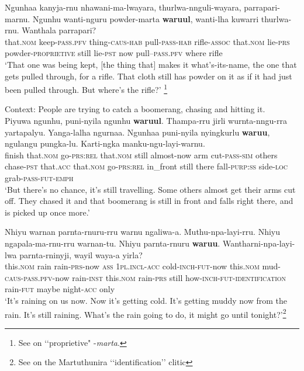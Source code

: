 \begin{exe}
	\ex\label{exappendixMartuthinura1}
	\gll Ngunhaa kanyja-rnu nhawani-ma-lwayara, thurlwa-nnguli-wayara, parrapari-marnu. Ngunhu wanti-nguru powder-marta \textbf{waruul}, wanti-lha kuwarri thurlwa-rnu. Wanthala parrapari?\\
	that.\textsc{nom} keep-\textsc{pass}.\textsc{pfv} thing-\textsc{caus}-\textsc{hab} pull-\textsc{pass}-\textsc{hab} rifle-\textsc{assoc} that.\textsc{nom} lie-\textsc{prs} powder-\textsc{proprietive} still lie-\textsc{pst} now pull--\textsc{pass}.\textsc{pfv}  where rifle\\
	\glt \lq That one was being kept, [the thing that] makes it what's-its-name, the one that gets pulled through, for a rifle. That cloth still has powder on it as if it had just been pulled through. But where's the rifle?'  \parencite[147]{Dench1994}\footnote{See \textcite[84–87]{Dench1994} on \lq\lq proprietive" \mbox{-\textit{marta}}.}

	\ex\label{exappendixMartuthinura2}
	Context: People are trying to catch a boomerang, chasing and hitting it.\\
	\gll Piyuwa ngunhu, puni-nyila ngunhu \textbf{waruul}. Thampa-rru jirli wurnta-nngu-rra yartapalyu. Yanga-lalha ngurnaa. Ngunhaa puni-nyila nyingkurlu \textbf{waruu}, ngulangu pungka-lu. Karti-ngka manku-ngu-layi-warnu. \\
	finish that.\textsc{nom} go-\textsc{prs}:\textsc{rel} that.\textsc{nom} still almost-now arm cut-\textsc{pass}-\textsc{sim} others chase-\textsc{pst} that.\textsc{acc} that.\textsc{nom} go-\textsc{prs}:\textsc{rel} in\_front still there fall-\textsc{purp}:\textsc{ss} side-\textsc{loc} grab-\textsc{pass}-\textsc{fut}-\textsc{emph}\\
	 \glt \lq But there's no chance, it's still travelling. Some others almost get their arms cut off. They chased it and that boomerang is still in front and falls right there, and is picked up once more.\rq{ }\parencite[293–294]{Dench1994}

	\ex \label{exappendixMartuthinura3}
	 \gll Nhiyu warnan parnta-rnuru-rru warnu ngaliwa-a. Muthu-npa-layi-rru. Nhiyu ngapala-ma-rnu-rru warnan-tu. Nhiyu parnta-rnuru \textbf{waruu}. Wantharni-npa-layi-lwa parnta-rninyji, wayil waya-a yirla?\\
	this.\textsc{nom} rain rain-\textsc{prs}-now \textsc{ass} 1\textsc{pl}.\textsc{incl}-\textsc{acc} cold-\textsc{inch}-\textsc{fut}-now this.\textsc{nom} mud-\textsc{caus}-\textsc{pass}.\textsc{pfv}-now rain-\textsc{inst} this.\textsc{nom} rain-\textsc{prs} still how-\textsc{inch}-\textsc{fut}-\textsc{identification} rain-\textsc{fut} maybe night-\textsc{acc} only\\
	\glt \lq It's raining on us now. Now it's getting cold. It's getting muddy now from the rain. It's still raining. What's the rain going to do, it might go until tonight?\rq{}\footnote{See \textcite[182–183]{Dench1994} on the Martuthunira \lq\lq{}identification\rq\rq{ }clitic} \parencite[184]{Dench1994}
	

\end{exe}
